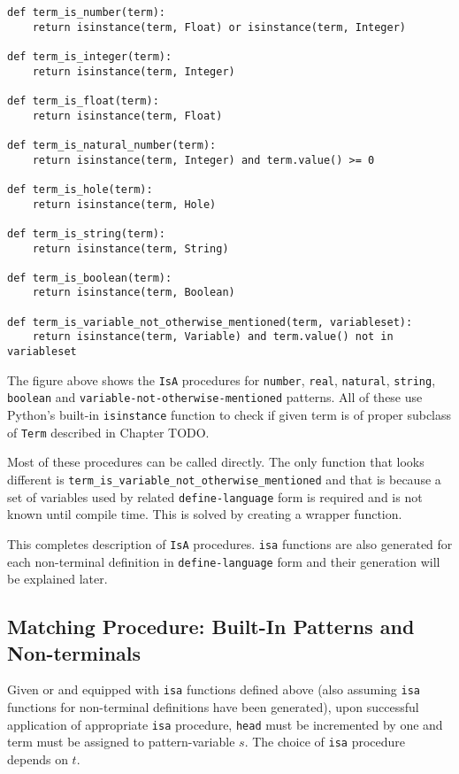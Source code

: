 \begin{lstlisting}
def term_is_number(term):
    return isinstance(term, Float) or isinstance(term, Integer)

def term_is_integer(term):
    return isinstance(term, Integer) 

def term_is_float(term):
    return isinstance(term, Float) 

def term_is_natural_number(term):
    return isinstance(term, Integer) and term.value() >= 0

def term_is_hole(term):
    return isinstance(term, Hole) 

def term_is_string(term):
    return isinstance(term, String) 

def term_is_boolean(term):
    return isinstance(term, Boolean) 

def term_is_variable_not_otherwise_mentioned(term, variableset):
    return isinstance(term, Variable) and term.value() not in variableset
\end{lstlisting}

The figure above shows the \texttt{IsA} procedures for \texttt{number}, \texttt{real}, \texttt{natural}, \texttt{string}, \texttt{boolean} and \texttt{variable-not-otherwise-mentioned} patterns. All of these use Python's built-in \texttt{isinstance} function to check if given term is of proper subclass of \texttt{Term} described in Chapter TODO.

Most of these procedures can be called directly. The only function that looks different is \texttt{term\_is\_variable\_not\_otherwise\_mentioned} and that is because a set of variables used by related \texttt{define-language} form is required and is not known until compile time. This is solved by creating a wrapper function. 

This completes description of \texttt{IsA} procedures. \texttt{isa} functions are also generated for each non-terminal definition in \texttt{define-language} form and their generation will be explained later.


\subsection{Matching Procedure: Built-In Patterns and Non-terminals}
Given \BuiltInPattern or \Nt and equipped with \texttt{isa} functions defined above (also assuming \texttt{isa} functions for non-terminal definitions have been generated), upon successful application of appropriate \texttt{isa} procedure, \texttt{head} must be incremented by one and term must be assigned to pattern-variable $s$. The choice of \texttt{isa} procedure depends on $t$.

